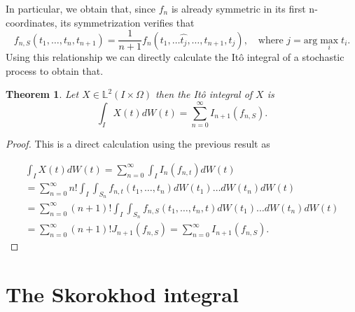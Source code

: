 \documentclass[12pt]{article}
\newtheorem{theorem}{Theorem}
\begin{document}
In particular, we obtain that, since $f_n$ is already symmetric in its first n-coordinates, its symmetrization verifies that
\begin{equation*}
	f_{n,S}(t_1,\ldots,t_n,t_{n+1})=\frac{1}{n+1}f_n(t_1,\ldots\hat{t_{j}},\ldots,t_{n+1},t_j),\quad \text{where } j=\text{arg}\max_i t_i.
\end{equation*}
Using this relationship we can directly calculate the Itô integral of a stochastic process to obtain that.
\begin{theorem}
	Let $X \in \mathbb{L}^2(I\times\Omega)$ then the Itô integral of $X$ is
	\begin{equation*}
		\int_{I} X(t) dW(t)=\sum_{n=0}^{\infty} I_{n+1}(f_{n,S}).
	\end{equation*}
\end{theorem}
\begin{proof}
	This is a direct calculation using the previous result as


	\begin{multline*}
		\int_{I} X(t) dW(t)=\sum_{n=0}^{\infty}\int_{I} I_n(f_{n,t})dW(t)\\=\sum_{n=0}^{\infty}n! \int_{I}\int_{S_n}f_{n,t}(t_1,\ldots,t_n) dW(t_1)\ldots dW(t_n) dW(t)\\=\sum_{n=0}^{\infty}(n+1)! \int_{I}\int_{S_n}f_{n,S}(t_1,\ldots,t_n,t) dW(t_1)\ldots dW(t_n) dW(t)\\=\sum_{n=0}^{\infty}(n+1)! J_{n+1}(f_{n,S}) =\sum_{n=0}^{\infty}  I_{n+1}(f_{n,S}).
	\end{multline*}

\end{proof}
\section{The Skorokhod integral}%
\end{document}
